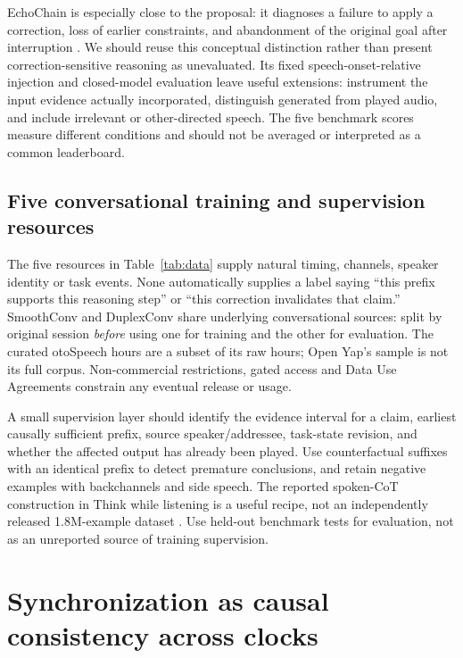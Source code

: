 \documentclass{article}
\begin{document}
EchoChain is especially close to the proposal: it diagnoses a failure to apply a correction, loss of earlier constraints, and abandonment of the original goal after interruption \citep{echochain}. We should reuse this conceptual distinction rather than present correction-sensitive reasoning as unevaluated. Its fixed speech-onset-relative injection and closed-model evaluation leave useful extensions: instrument the input evidence actually incorporated, distinguish generated from played audio, and include irrelevant or other-directed speech. The five benchmark scores measure different conditions and should not be averaged or interpreted as a common leaderboard.

\subsection{Five conversational training and supervision resources}

The five resources in Table~\ref{tab:data} supply natural timing, channels, speaker identity or task events. None automatically supplies a label saying ``this prefix supports this reasoning step'' or ``this correction invalidates that claim.'' SmoothConv and DuplexConv share underlying conversational sources: split by original session \emph{before} using one for training and the other for evaluation. The curated otoSpeech hours are a subset of its raw hours; Open Yap's sample is not its full corpus. Non-commercial restrictions, gated access and Data Use Agreements constrain any eventual release or usage.

A small supervision layer should identify the evidence interval for a claim, earliest causally sufficient prefix, source speaker/addressee, task-state revision, and whether the affected output has already been played. Use counterfactual suffixes with an identical prefix to detect premature conclusions, and retain negative examples with backchannels and side speech. The reported spoken-CoT construction in Think while listening is a useful recipe, not an independently released 1.8M-example dataset \citep{thinklisten}. Use held-out benchmark tests for evaluation, not as an unreported source of training supervision.

\section{Synchronization as causal consistency across clocks}
\label{sec:clocks}
\end{document}
